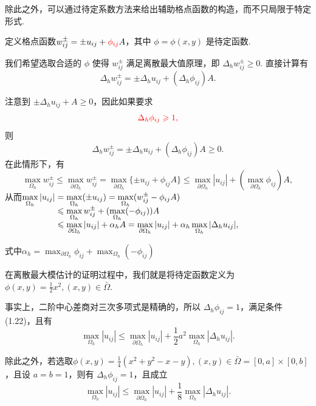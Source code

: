 除此之外，可以通过待定系数方法来给出辅助格点函数的构造，而不只局限于特定形式.\par
定义格点函数$w_{ij}^{\pm} = \pm u_{ij} + {\color{red}\phi_{ij}} A$，其中 $\phi = \phi(x,y)$ 是待定函数.\par
我们希望选取合适的 $\phi$ 使得 $w_{ij}^{\pm}$ 满足离散最大值原理，即 $\Delta_h w_{ij}^{\pm} \geq 0$. 直接计算有
\begin{equation*}
    \Delta_h w_{ij}^{\pm} = \pm \Delta_h u_{ij} + (\Delta_h \phi_{ij}) A.
\end{equation*}\par
注意到 $\pm \Delta_h u_{ij} + A \geq 0$，因此如果要求
\begin{equation}
    {\color{red} \Delta_h \phi_{ij} \geq 1,} 
\end{equation}
则
\begin{equation*}
    \Delta_h w_{ij}^{\pm} = \pm \Delta_h u_{ij} + (\Delta_h \phi_{ij}) A \geq 0.
\end{equation*}
在此情形下，有
\begin{equation*}
    \max_{\Omega_h} w_{ij}^{\pm} \leq \max_{\partial\Omega_h} w_{ij}^{\pm} = \max_{\partial\Omega_h} \{\pm u_{ij} + \phi_{ij} A\} \leq \max_{\partial\Omega_h} |u_{ij}| + (\max_{\partial\Omega_h} \phi_{ij}) A,
\end{equation*}
从而$\setjot[-2]\begin{aligned}[t]
    \max_{\Omega_h} |u_{ij}| &= \max_{\Omega_h} (\pm u_{ij}) = \max_{\Omega_h} (w_{ij}^{\pm} - \phi_{ij} A) \\
    &\leq \max_{\Omega_h} w_{ij}^{\pm} + (\max_{\Omega_h} (-\phi_{ij})) A \\
    &\leq \max_{\partial\Omega_h} |u_{ij}| + \alpha_h A = \max_{\partial\Omega_h} |u_{ij}| + \alpha_h \max_{\Omega_h} |\Delta_h u_{ij}|,
\end{aligned}$\par
式中$\alpha_h = \max_{\partial\Omega_h} \phi_{ij} + \max_{\Omega_h} (-\phi_{ij})$\par
在离散最大模估计的证明过程中，我们就是将待定函数定义为$\phi(x,y) = \frac{1}{2}x^2, (x,y) \in \bar{\Omega}$.\par
事实上，二阶中心差商对三次多项式是精确的，所以 $\Delta_h \phi_{ij} = 1$，满足条件(1.22)，且有
\begin{equation*}
    \max_{\Omega_h} |u_{ij}| \leq \max_{\partial\Omega_h} |u_{ij}| + \frac{1}{2}a^2 \max_{\Omega_h} |\Delta_h u_{ij}|.
\end{equation*}\par
除此之外，若选取$\phi(x,y) = \frac{1}{4}(x^2 + y^2 - x - y), (x,y) \in \bar{\Omega} = [0, a] \times [0, b]$，且设 $a = b = 1$，则有 $\Delta_h \phi_{ij} = 1$，且成立
\begin{equation*}
    \max_{\Omega_h} |u_{ij}| \leq \max_{\partial\Omega_h} |u_{ij}| + \frac{1}{8} \max_{\Omega_h} |\Delta_h u_{ij}|.
\end{equation*}

